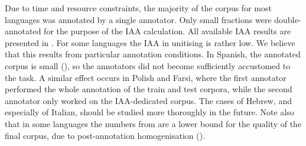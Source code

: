 \documentclass[output=paper,
modfonts,
]{langscibook}
\begin{document}
Due to time and resource constraints, the majority of the corpus for most languages was annotated by a single annotator. %
Only small fractions were double-annotated for the purpose of the IAA calculation. 
All available IAA results are presented in .
For some languages the IAA in unitising is rather low. We believe that this results from particular annotation conditions. In Spanish, the annotated corpus is small (), %
so the annotators did not become sufficiently accustomed to the task. A similar effect occurs in Polish and Farsi, where the first annotator performed the whole annotation of the train and test corpora, while the second annotator only worked on the IAA-dedicated corpus. The cases of Hebrew, and especially of Italian, should be studied more thoroughly in the future. Note also that in some languages the numbers from  are a lower bound for the quality of the final corpus, due to post-annotation homogenisation  (). 
\end{document}
